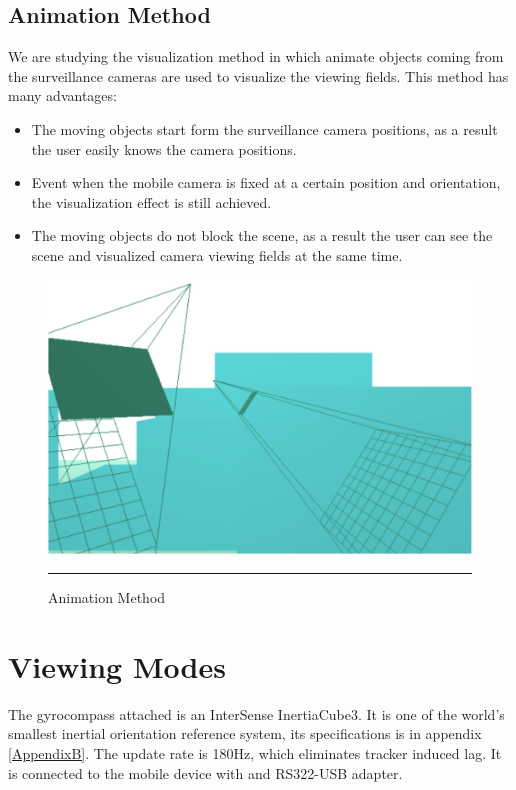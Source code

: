 \subsection{Animation Method}

We are studying the visualization method in which animate objects coming from the surveillance cameras are used to visualize the viewing fields. This method has  many advantages:

\begin{itemize}
	\item The moving objects start form the surveillance camera positions, as a result the user easily knows the camera positions.
	\item Event when the mobile camera is fixed at a certain position and orientation, the visualization effect is still achieved.
	\item The moving objects do not block the scene, as a result the user can see the scene and visualized camera viewing fields at the same time.
\end{itemize}

\begin{figure}[htbp]
	\centering
	\includegraphics{./Primitives/theory_animation.png}
	\rule{35em}{0.5pt}
	\caption[Animation Method]{Animation Method}
	\label{fig:AnimationMethod}
\end{figure}


\section{Viewing Modes}

The gyrocompass attached is an InterSense InertiaCube3. It is one of the world's smallest inertial orientation reference system, its specifications is in appendix \ref{AppendixB}. The update rate is 180Hz, which eliminates tracker induced lag. It is connected to the mobile device with and RS322-USB adapter.
